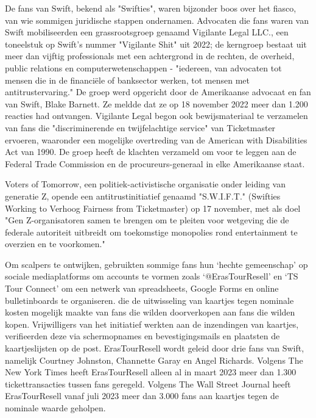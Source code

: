 De fans van Swift, bekend als "Swifties", waren bijzonder boos over het fiasco, van wie sommigen juridische stappen ondernamen. Advocaten die fans waren van Swift mobiliseerden een grassrootsgroep genaamd Vigilante Legal LLC., een toneelstuk op Swift's nummer "Vigilante Shit" uit 2022; de kerngroep bestaat uit meer dan vijftig professionals met een achtergrond in de rechten, de overheid, public relations en computerwetenschappen - "iedereen, van advocaten tot mensen die in de financiële of banksector werken, tot mensen met antitrustervaring." De groep werd opgericht door de Amerikaanse advocaat en fan van Swift, Blake Barnett. Ze meldde dat ze op 18 november 2022 meer dan 1.200 reacties had ontvangen. Vigilante Legal begon ook bewijsmateriaal te verzamelen van fans die "discriminerende en twijfelachtige service" van Ticketmaster ervoeren, waaronder een mogelijke overtreding van de American with Disabilities Act van 1990. De groep heeft de klachten verzameld om voor te leggen aan de Federal Trade Commission en de procureurs-generaal in elke Amerikaanse staat.

Voters of Tomorrow, een politiek-activistische organisatie onder leiding van generatie Z, opende een antitrustinitiatief genaamd "S.W.I.F.T." (Swifties Working to Verhoog Fairness from Ticketmaster) op 17 november, met als doel "Gen Z-organisatoren samen te brengen om te pleiten voor wetgeving die de federale autoriteit uitbreidt om toekomstige monopolies rond entertainment te overzien en te voorkomen."

Om scalpers te ontwijken, gebruikten sommige fans hun ‘hechte gemeenschap’ op sociale mediaplatforms om accounts te vormen zoals ‘@ErasTourResell’ en ‘TS Tour Connect’ om een netwerk van spreadsheets, Google Forms en online bulletinboards te organiseren. die de uitwisseling van kaartjes tegen nominale kosten mogelijk maakte van fans die wilden doorverkopen aan fans die wilden kopen. Vrijwilligers van het initiatief werkten aan de inzendingen van kaartjes, verifieerden deze via schermopnames en bevestigingsmails en plaatsten de kaartjeslijsten op de post. ErasTourResell wordt geleid door drie fans van Swift, namelijk Courtney Johnston, Channette Garay en Angel Richards. Volgens The New York Times heeft ErasTourResell alleen al in maart 2023 meer dan 1.300 tickettransacties tussen fans geregeld. Volgens The Wall Street Journal heeft ErasTourResell vanaf juli 2023 meer dan 3.000 fans aan kaartjes tegen de nominale waarde geholpen.


